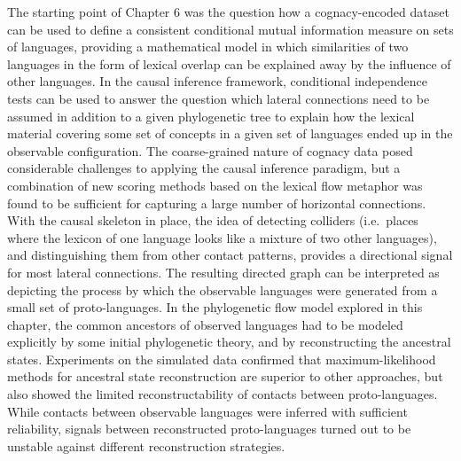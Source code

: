 The starting point of Chapter 6 was the question how a cognacy-encoded dataset can be used to define a consistent conditional mutual information measure on sets of languages, providing a mathematical model in which similarities of two languages in the form of lexical overlap can be explained away by the influence of other languages. In the causal inference framework, conditional independence tests can be used to answer the question which lateral connections need to be assumed in addition to a given phylogenetic tree to explain how the lexical material covering some set of concepts in a given set of languages ended up in the observable configuration. The coarse-grained nature of cognacy data posed considerable challenges to applying the causal inference paradigm, but a combination of new scoring methods based on the lexical flow metaphor was found to be sufficient for capturing a large number of horizontal connections. With the causal skeleton in place, the idea of detecting colliders (i.e.\ places where the lexicon of one language looks like a mixture of two other languages), and distinguishing them from other contact patterns, provides a directional signal for most lateral connections. The resulting directed graph can be interpreted as depicting the process by which the observable languages were generated from a small set of proto-languages. In the phylogenetic flow model explored in this chapter, the common ancestors of observed languages had to be modeled explicitly by some initial phylogenetic theory, and by reconstructing the ancestral states. Experiments on the simulated data confirmed that maximum-likelihood methods for ancestral state reconstruction are superior to other approaches, but also showed the limited reconstructability of contacts between proto-languages. While contacts between observable languages were inferred with sufficient reliability, signals between reconstructed proto-languages turned out to be unstable against different reconstruction strategies.

